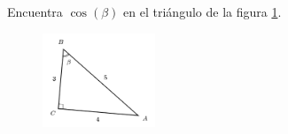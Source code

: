 \question[15] Encuentra $\cos(\beta)$ en el triángulo de la figura \ref{fig:functrig07}.
\begin{figure}[H]
    \begin{center}
        \includegraphics[width=0.3\textwidth]{../images/functrig07.png}
    \end{center}
    \caption{}
    \label{fig:functrig07}
\end{figure}
